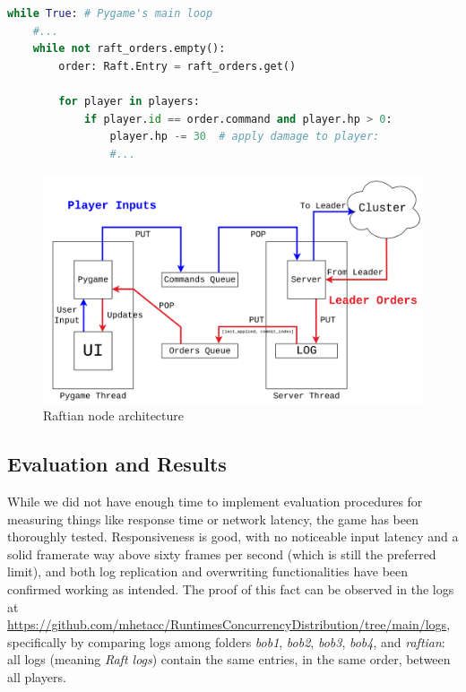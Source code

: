 \begin{lstlisting}[language={Python},label={code:updateUI}, caption={Pygame periodically checks whether there are new orders and updates the UI accordingly}]
while True: # Pygame's main loop
    #...
    while not raft_orders.empty():
        order: Raft.Entry = raft_orders.get()

        for player in players:
            if player.id == order.command and player.hp > 0:
                player.hp -= 30  # apply damage to player:
                #...
\end{lstlisting}

\begin{figure}[h]
  \centering
  \includegraphics[width=\linewidth]{images/nodeArchitecture.png}
  
  \caption{Raftian node architecture}
  \label{fig:raftianArch}
\end{figure}

\subsection{Evaluation and Results}

While we did not have enough time to implement evaluation procedures for measuring things like response time or network latency, the game has been thoroughly tested. Responsiveness is good, with no noticeable input latency and a solid framerate way above sixty frames per second (which is still the preferred limit), and both log replication and overwriting functionalities have been confirmed working as intended. The proof of this fact can be observed in the logs at \url{https://github.com/mhetacc/RuntimesConcurrencyDistribution/tree/main/logs}, specifically by comparing logs among folders \textit{bob1}, \textit{bob2}, \textit{bob3}, \textit{bob4}, and \textit{raftian}: all logs (meaning \textit{Raft logs}) contain the same entries, in the same order, between all players.
